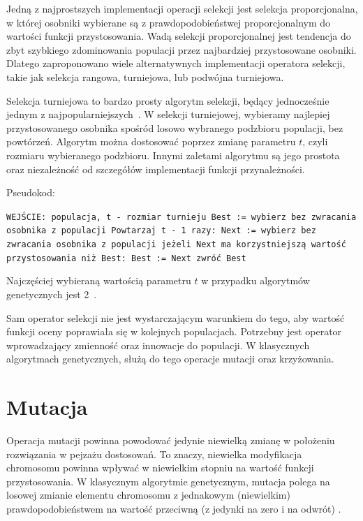\documentclass[brudnopis]{xmgr}
\begin{document}
Jedną z najprostszych implementacji operacji selekcji jest selekcja proporcjonalna, w której osobniki wybierane są z prawdopodobieństwej proporcjonalnym do wartości funkcji przystosowania. Wadą selekcji proporcjonalnej jest tendencja do zbyt szybkiego zdominowania populacji przez najbardziej przystosowane osobniki. Dlatego zaproponowano wiele alternatywnych implementacji operatora selekcji, takie jak selekcja rangowa, turniejowa, lub podwójna turniejowa.

Selekcja turniejowa to bardzo prosty algorytm selekcji, będący jednocześnie jednym z najpopularniejszych~\cite{Luke2009Metaheuristics}. W selekcji turniejowej, wybieramy najlepiej przystosowanego osobnika spośród losowo wybranego podzbioru populacji, bez powtórzeń. Algorytm można dostosować poprzez zmianę parametru $t$, czyli rozmiaru wybieranego podzbioru. Innymi zaletami algorytmu są jego prostota oraz niezależność od szczegółów implementacji funkcji przynależności.

Pseudokod:\newline

\noindent
\texttt{WEJŚCIE: populacja, t - rozmiar turnieju\newline
Best := wybierz bez zwracania osobnika z populacji\newline
Powtarzaj t - 1 razy:\newline
\indent Next := wybierz bez zwracania osobnika z populacji\newline
\indent jeżeli Next ma korzystniejszą wartość przystosowania niż Best:\newline
\indent\indent Best := Next\newline
zwróć Best\newline
}

Najczęściej wybieraną wartością parametru $t$ w przypadku algorytmów genetycznych jest 2~\cite{Luke2009Metaheuristics}.

Sam operator selekcji nie jest wystarczającym warunkiem do tego, aby wartość funkcji oceny poprawiała się w kolejnych populacjach. Potrzebny jest operator wprowadzający zmienność oraz innowacje do populacji. W klasycznych algorytmach genetycznych, służą do tego operacje mutacji oraz krzyżowania.

\section{Mutacja}

Operacja mutacji powinna powodować jedynie niewielką zmianę w położeniu rozwiązania w pejzażu dostosowań. To znaczy, niewielka modyfikacja chromosomu powinna wpływać w niewielkim stopniu na wartość funkcji przystosowania. W klasycznym algorytmie genetycznym, mutacja polega na losowej zmianie elementu chromosomu z jednakowym (niewielkim) prawdopodobieństwem na wartość przeciwną (z jedynki na zero i na odwrót) \cite{Goldberg:1998:AGZ}.
\end{document}
